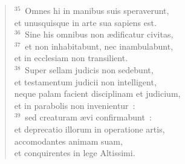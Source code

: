 \begin{flushleft}
\begin{verse}
${}^{35}$~Omnes hi in manibus suis speraverunt,\\ et unusquisque in arte sua sapiens est.\\
${}^{36}$~Sine his omnibus non \ae dificatur civitas,\\
${}^{37}$~et non inhabitabunt, nec inambulabunt,\\ et in ecclesiam non transilient.\\
${}^{38}$~Super sellam judicis non sedebunt,\\ et testamentum judicii non intelligent,\\ neque palam facient disciplinam et judicium,\\ et in parabolis non invenientur~:\\
${}^{39}$~sed creaturam \ae vi confirmabunt~:\\ et deprecatio illorum in operatione artis,\\ accomodantes animam suam,\\ et conquirentes in lege Altissimi.\end{verse}\end{flushleft}


